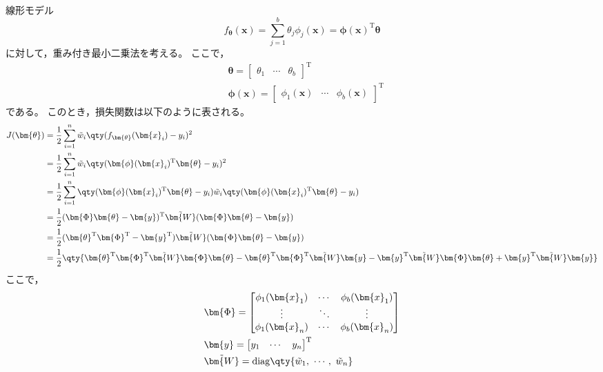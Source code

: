 \documentclass[class=jsarticle, crop=false, dvipdfmx, fleqn]{standalone}
\begin{document}
\section{}

線形モデル
\begin{equation}
	f_{\bm{\theta}}(\bm{x})
		= \sum_{j=1}^{b} \theta_j \phi_j (\bm{x})
		= \bm{\phi}(\bm{x})^\mathrm{T} \bm{\theta}
\end{equation}
に対して，重み付き最小二乗法を考える。
ここで，
\begin{align}
	& \bm{\theta} =
		\begin{bmatrix}
			\theta_1 & \cdots & \theta_b
		\end{bmatrix}^\mathrm{T} \\
	& \bm{\phi}(\bm{x}) =
		\begin{bmatrix}
			\phi_1 (\bm{x}) & \cdots & \phi_b (\bm{x})
		\end{bmatrix}^\mathrm{T}
\end{align}
である。
このとき，損失関数は以下のように表される。
\begin{align}
	J(\bm{\theta})
		& = \frac{1}{2} \sum_{i=1}^{n} \tilde{w}_i \qty(f_{\bm{\theta}}(\bm{x}_i) - y_i)^2 \\
		& = \frac{1}{2} \sum_{i=1}^{n} \tilde{w}_i \qty(\bm{\phi}(\bm{x}_i)^\mathrm{T} \bm{\theta} - y_i)^2 \\
		& = \frac{1}{2} \sum_{i=1}^{n} \qty(\bm{\phi}(\bm{x}_i)^\mathrm{T} \bm{\theta} - y_i) \tilde{w}_i \qty(\bm{\phi}(\bm{x}_i)^\mathrm{T} \bm{\theta} - y_i) \\
		& = \frac{1}{2} (\bm{\Phi}\bm{\theta} - \bm{y})^\mathrm{T} \tilde{\bm{W}} (\bm{\Phi}\bm{\theta} - \bm{y}) \\
		& = \frac{1}{2} (\bm{\theta}^\mathrm{T} \bm{\Phi}^\mathrm{T} - \bm{y}^\mathrm{T}) \tilde{\bm{W}} (\bm{\Phi}\bm{\theta} - \bm{y}) \\
		& = \frac{1}{2} \qty{\bm{\theta}^\mathrm{T} \bm{\Phi}^\mathrm{T}\tilde{\bm{W}}\bm{\Phi}\bm{\theta} - \bm{\theta}^\mathrm{T} \bm{\Phi}^\mathrm{T} \tilde{\bm{W}}\bm{y} - \bm{y}^\mathrm{T}\tilde{\bm{W}}\bm{\Phi}\bm{\theta} + \bm{y}^\mathrm{T} \tilde{\bm{W}} \bm{y}}
\end{align}
ここで，
\begin{align}
	& \bm{\Phi} =
		\begin{bmatrix}
			\phi_1 (\bm{x}_1) & \cdots & \phi_b (\bm{x}_1) \\
			\vdots & \ddots & \vdots \\
			\phi_1 (\bm{x}_n) & \cdots & \phi_b (\bm{x}_n) \\
		\end{bmatrix} \\
	& \bm{y} =
		\begin{bmatrix}
			y_1 & \cdots & y_n
		\end{bmatrix}^\mathrm{T} \\
	& \tilde{\bm{W}} = \mathrm{diag}\qty{\tilde{w}_1,\ \cdots,\ \tilde{w}_n}
\end{align}
\end{document}
